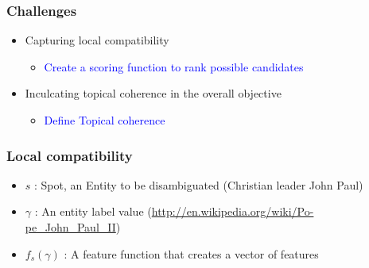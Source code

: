 \documentclass{beamer}
\begin{document}
\begin{frame}
 \frametitle{Challenges}
 \begin{itemize}
  \item Capturing local compatibility
  \begin{itemize}
   \item \textcolor{blue}{Create a scoring function to rank possible candidates}
  \end{itemize}

  \item Inculcating topical coherence in the overall objective

  \begin{itemize}
   \item \textcolor{blue}{Define Topical coherence}
  \end{itemize}

  \end{itemize}

\end{frame}

\begin{frame}
 \frametitle{Local compatibility}
 \begin{itemize}
  \item $s$ : Spot, an Entity to be disambiguated (Christian leader John Paul) \bigskip 
  \item $\gamma$ : An entity label value (\url{http://en.wikipedia.org/wiki/Po-pe_John_Paul_II})  \bigskip 
 \item $f_s(\gamma)$ : A feature function that creates a vector of features
 \end{itemize}

  
\end{frame}
\end{document}
